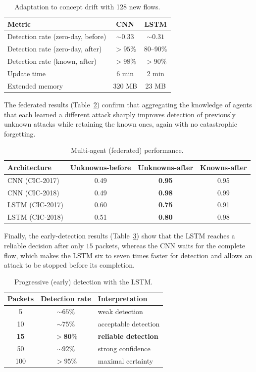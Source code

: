 \documentclass[11pt,a4paper]{article}
\begin{document}
\begin{table}[h]
\centering
\caption{Adaptation to concept drift with 128 new flows.}
\label{tab:adapt}
\small
\begin{tabular}{@{}lcc@{}}
\toprule
\textbf{Metric} & \textbf{CNN} & \textbf{LSTM} \\
\midrule
Detection rate (zero-day, before) & $\sim 0.33$ & $\sim 0.31$ \\
Detection rate (zero-day, after) & $>95\%$ & 80--90\% \\
Detection rate (known, after) & $>98\%$ & $>90\%$ \\
Update time & 6 min & 2 min \\
Extended memory & 320 MB & 23 MB \\
\bottomrule
\end{tabular}
\end{table}

The federated results (Table~\ref{tab:fed}) confirm that aggregating the knowledge of agents that each learned a different attack sharply improves detection of previously unknown attacks while retaining the known ones, again with no catastrophic forgetting.

\begin{table}[h]
\centering
\caption{Multi-agent (federated) performance.}
\label{tab:fed}
\small
\begin{tabular}{@{}lccc@{}}
\toprule
\textbf{Architecture} & \textbf{Unknowns-before} & \textbf{Unknowns-after} & \textbf{Knowns-after} \\
\midrule
CNN (CIC-2017) & 0.49 & \textbf{0.95} & 0.95 \\
CNN (CIC-2018) & 0.49 & \textbf{0.98} & 0.99 \\
LSTM (CIC-2017) & 0.60 & \textbf{0.75} & 0.91 \\
LSTM (CIC-2018) & 0.51 & \textbf{0.80} & 0.98 \\
\bottomrule
\end{tabular}
\end{table}

Finally, the early-detection results (Table~\ref{tab:early}) show that the LSTM reaches a reliable decision after only $15$ packets, whereas the CNN waits for the complete flow, which makes the LSTM six to seven times faster for detection and allows an attack to be stopped before its completion.

\begin{table}[h]
\centering
\caption{Progressive (early) detection with the LSTM.}
\label{tab:early}
\small
\begin{tabular}{@{}ccl@{}}
\toprule
\textbf{Packets} & \textbf{Detection rate} & \textbf{Interpretation} \\
\midrule
5 & $\sim 65\%$ & weak detection \\
10 & $\sim 75\%$ & acceptable detection \\
\textbf{15} & $\boldsymbol{>80\%}$ & \textbf{reliable detection} \\
50 & $\sim 92\%$ & strong confidence \\
100 & $>95\%$ & maximal certainty \\
\bottomrule
\end{tabular}
\end{table}
\end{document}
